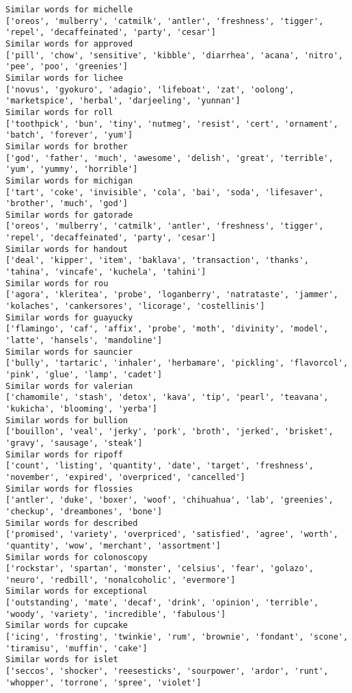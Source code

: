 \documentclass[11pt]{article}
\begin{document}
\begin{Verbatim}[commandchars=\\\{\}]
Similar words for michelle
['oreos', 'mulberry', 'catmilk', 'antler', 'freshness', 'tigger', 'repel', 'decaffeinated', 'party', 'cesar']
Similar words for approved
['pill', 'chow', 'sensitive', 'kibble', 'diarrhea', 'acana', 'nitro', 'pee', 'poo', 'greenies']
Similar words for lichee
['novus', 'gyokuro', 'adagio', 'lifeboat', 'zat', 'oolong', 'marketspice', 'herbal', 'darjeeling', 'yunnan']
Similar words for roll
['toothpick', 'bun', 'tiny', 'nutmeg', 'resist', 'cert', 'ornament', 'batch', 'forever', 'yum']
Similar words for brother
['god', 'father', 'much', 'awesome', 'delish', 'great', 'terrible', 'yum', 'yummy', 'horrible']
Similar words for michigan
['tart', 'coke', 'invisible', 'cola', 'bai', 'soda', 'lifesaver', 'brother', 'much', 'god']
Similar words for gatorade
['oreos', 'mulberry', 'catmilk', 'antler', 'freshness', 'tigger', 'repel', 'decaffeinated', 'party', 'cesar']
Similar words for handout
['deal', 'kipper', 'item', 'baklava', 'transaction', 'thanks', 'tahina', 'vincafe', 'kuchela', 'tahini']
Similar words for rou
['agora', 'kleritea', 'probe', 'loganberry', 'natrataste', 'jammer', 'kolaches', 'cankersores', 'licorage', 'costellinis']
Similar words for guayucky
['flamingo', 'caf', 'affix', 'probe', 'moth', 'divinity', 'model', 'latte', 'hansels', 'mandoline']
Similar words for sauncier
['bully', 'tartaric', 'inhaler', 'herbamare', 'pickling', 'flavorcol', 'pink', 'glue', 'lamp', 'cadet']
Similar words for valerian
['chamomile', 'stash', 'detox', 'kava', 'tip', 'pearl', 'teavana', 'kukicha', 'blooming', 'yerba']
Similar words for bullion
['bouillon', 'veal', 'jerky', 'pork', 'broth', 'jerked', 'brisket', 'gravy', 'sausage', 'steak']
Similar words for ripoff
['count', 'listing', 'quantity', 'date', 'target', 'freshness', 'november', 'expired', 'overpriced', 'cancelled']
Similar words for flossies
['antler', 'duke', 'boxer', 'woof', 'chihuahua', 'lab', 'greenies', 'checkup', 'dreambones', 'bone']
Similar words for described
['promised', 'variety', 'overpriced', 'satisfied', 'agree', 'worth', 'quantity', 'wow', 'merchant', 'assortment']
Similar words for colonoscopy
['rockstar', 'spartan', 'monster', 'celsius', 'fear', 'golazo', 'neuro', 'redbill', 'nonalcoholic', 'evermore']
Similar words for exceptional
['outstanding', 'mate', 'decaf', 'drink', 'opinion', 'terrible', 'woody', 'variety', 'incredible', 'fabulous']
Similar words for cupcake
['icing', 'frosting', 'twinkie', 'rum', 'brownie', 'fondant', 'scone', 'tiramisu', 'muffin', 'cake']
Similar words for islet
['seccos', 'shocker', 'reesesticks', 'sourpower', 'ardor', 'runt', 'whopper', 'torrone', 'spree', 'violet']

\end{Verbatim}
\end{document}
